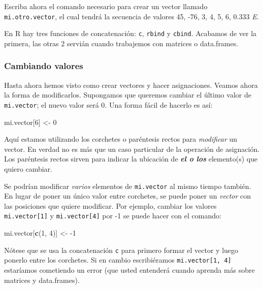 \documentclass[]{article}
\newenvironment{Shaded}{}{}
\newcommand{\KeywordTok}[1]{\textcolor[rgb]{0.00,0.44,0.13}{\textbf{{#1}}}}
\newcommand{\DecValTok}[1]{\textcolor[rgb]{0.25,0.63,0.44}{{#1}}}
\newcommand{\NormalTok}[1]{{#1}}
\begin{document}
Escriba ahora el comando necesario para crear un vector llamado
\texttt{mi.otro.vector}, el cual tendrá la secuencia de valores 45, -76,
3, 4, 5, 6, 0.333 \emph{E}.

En R hay tres funciones de concatenación: \texttt{c}, \texttt{rbind} y
\texttt{cbind}. Acabamos de ver la primera, las otras 2 servián cuando
trabajemos con matrices o data.frames.

\subsubsection{Cambiando valores}

Hasta ahora hemos visto como crear vectores y hacer asignaciones. Veamos
ahora la forma de modificarlos. Supongamos que queremos cambiar el
último valor de \texttt{mi.vector}; el nuevo valor será 0. Una forma
fácil de hacerlo es así:

\begin{Shaded}
\begin{Highlighting}[]
\NormalTok{mi.vector[}\DecValTok{6}\NormalTok{] <- }\DecValTok{0}
\end{Highlighting}
\end{Shaded}
Aquí estamos utilizando los corchetes o paréntesis rectos para
\emph{modificar} un vector. En verdad no es más que un caso particular
de la operación de asignación. Los paréntesis rectos sirven para indicar
la ubicación de \emph{\textbf{el o los}} elemento(s) que quiero cambiar.

Se podrían modificar \emph{varios} elementos de \texttt{mi.vector} al
mismo tiempo también. En lugar de poner un único valor entre corchetes,
se puede poner un \emph{vector} con las posiciones que quiere modificar.
Por ejemplo, cambiar los valores \texttt{mi.vector{[}1{]}} y
\texttt{mi.vector{[}4{]}} por -1 se puede hacer con el comando:

\begin{Shaded}
\begin{Highlighting}[]
\NormalTok{mi.vector[}\KeywordTok{c}\NormalTok{(}\DecValTok{1}\NormalTok{, }\DecValTok{4}\NormalTok{)] <- -}\DecValTok{1}
\end{Highlighting}
\end{Shaded}
Nótese que se usa la concatenación \texttt{c} para primero formar el
vector y luego ponerlo entre los corchetes. Si en cambio escribiéramos
\texttt{mi.vector{[}1, 4{]}} estaríamos cometiendo un error (que usted
entenderá cuando aprenda más sobre matrices y data.frames).
\end{document}
